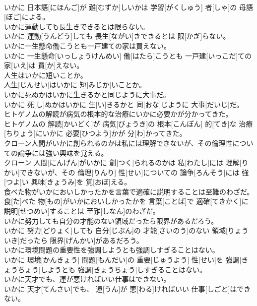 \documentclass[8pt]{extreport}
\begin{document}
\begin{CJK}{UTF8}{min}
\\	いかに 日本語[にほんご]が 難[むずか]しいかは 学習[がくしゅう] 者[しゃ]の 母語[ぼご]による。
\\	いかに運動しても長生きできるとは限らない。	
\\	いかに 運動[うんどう]しても 長生[ながい]きできるとは 限[かぎ]らない。
\\	いかに一生懸命働こうとも一戸建ての家は買えない。	
\\	いかに 一生懸命[いっしょうけんめい] 働[はたら]こうとも 一戸建[いっこだ]ての 家[いえ]は 買[か]えない。
\\	人生はいかに短いことか。	
\\	人生[じんせい]はいかに 短[みじか]いことか。
\\	いかに死ぬかはいかに生きるかと同じように大事だ。	
\\	いかに 死[し]ぬかはいかに 生[い]きるかと 同[おな]じように 大事[だいじ]だ。
\\	ヒトゲノムの解読が病気の根本的な治療にいかに必要かが分かってきた。	
\\	ヒトゲノムの 解読[かいどく]が 病気[びょうき]の 根本[こんぽん] 的[てき]な 治療[ちりょう]にいかに 必要[ひつよう]かが 分[わ]かってきた。
\\	クローン人間がいかに創られるのかは私には理解できないが、その倫理性についての論争には強い興味を覚える。	
\\	クローン 人間[にんげん]がいかに 創[つく]られるのかは 私[わたし]には 理解[りかい]できないが、その 倫理[りんり] 性[せい]についての 論争[ろんそう]には 強[つよ]い 興味[きょうみ]を 覚[おぼ]える。
\\	食べた物がいかにおいしかったかを言葉で適確に説明することは至難のわざだ。	
\\	食[た]べた 物[もの]がいかにおいしかったかを 言葉[ことば]で 適確[てきかく]に 説明[せつめい]することは 至難[しなん]のわざだ。
\\	いかに努力しても自分の才能のない領域だったら限界があるだろう。	
\\	いかに 努力[どりょく]しても 自分[じぶん]の 才能[さいのう]のない 領域[りょういき]だったら 限界[げんかい]があるだろう。
\\	いかに環境問題の重要性を強調しようとも強調しすぎることはない。	
\\	いかに 環境[かんきょう] 問題[もんだい]の 重要[じゅうよう] 性[せい]を 強調[きょうちょう]しようとも 強調[きょうちょう]しすぎることはない。
\\	いかに天才でも、運が悪ければいい仕事はできない。	
\\	いかに 天才[てんさい]でも、 運[うん]が 悪[わる]ければいい 仕事[しごと]はできない。

\end{CJK}
\end{document}
